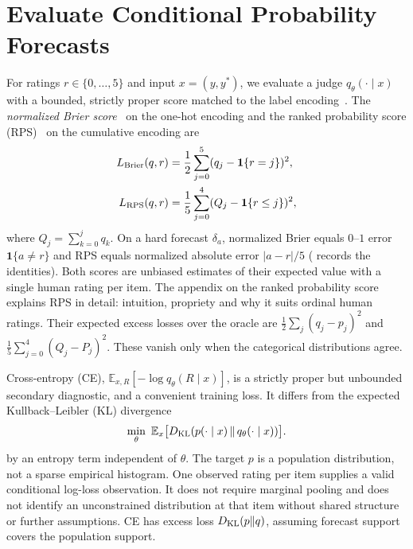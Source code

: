 \section{Evaluate Conditional Probability Forecasts}
\label{sec:proposal}
For ratings $r\in\{0,\ldots,5\}$ and input $x=(y,y^*)$, we evaluate a judge $q_\theta(\cdot\mid x)$ with a bounded, strictly proper score matched to the label encoding~\citep{gneiting2007strictly}.
The \emph{normalized Brier score}~\citep{brier1950verification} on the one-hot encoding and the ranked probability score (RPS)~\citep{epstein1969scoring} on the cumulative encoding are
\begin{align}
L_{\rm Brier}(q,r)&=\frac12\sum_{j=0}^{5}(q_j-\mathbf{1}\{r=j\})^2,\label{eq:brier-norm}\\
L_{\rm RPS}(q,r)&=\frac{1}{5}\sum_{j=0}^{4}(Q_j-\mathbf{1}\{r\leq j\})^2,
\end{align}
where $Q_j=\sum_{k=0}^j q_k$.
On a hard forecast $\delta_a$, normalized Brier equals $0$--$1$ error $\mathbf{1}\{a\neq r\}$ and RPS equals normalized absolute error $\lvert a-r\rvert/5$ ( records the identities).
Both scores are unbiased estimates of their expected value with a single human rating per item.
The appendix on the ranked probability score explains RPS in detail: intuition, propriety and why it suits ordinal human ratings.
Their expected excess losses over the oracle are $\frac12\sum_j(q_j-p_j)^2$ and $\frac{1}{5}\sum_{j=0}^4(Q_j-P_j)^2$.
These vanish only when the categorical distributions agree.

Cross-entropy (CE), $\mathbb{E}_{x,R}[-\log q_\theta(R\mid x)]$, is a strictly proper but unbounded secondary diagnostic, and a convenient training loss.
It differs from the expected Kullback--Leibler (KL) divergence
\begin{equation}
\min_\theta\ \mathbb{E}_{x}\big[\KL(p(\cdot\mid x)\,\|\,q_\theta(\cdot\mid x))\big].
\label{eq:kl}
\end{equation}
by an entropy term independent of $\theta$.
The target $p$ is a population distribution, not a sparse empirical histogram.
One observed rating per item supplies a valid conditional log-loss observation.
It does not require marginal pooling and does not identify an unconstrained distribution at that item without shared structure or further assumptions.
CE has excess loss $D_{\mathrm{KL}}(p\|q)$, assuming forecast support covers the population support.

